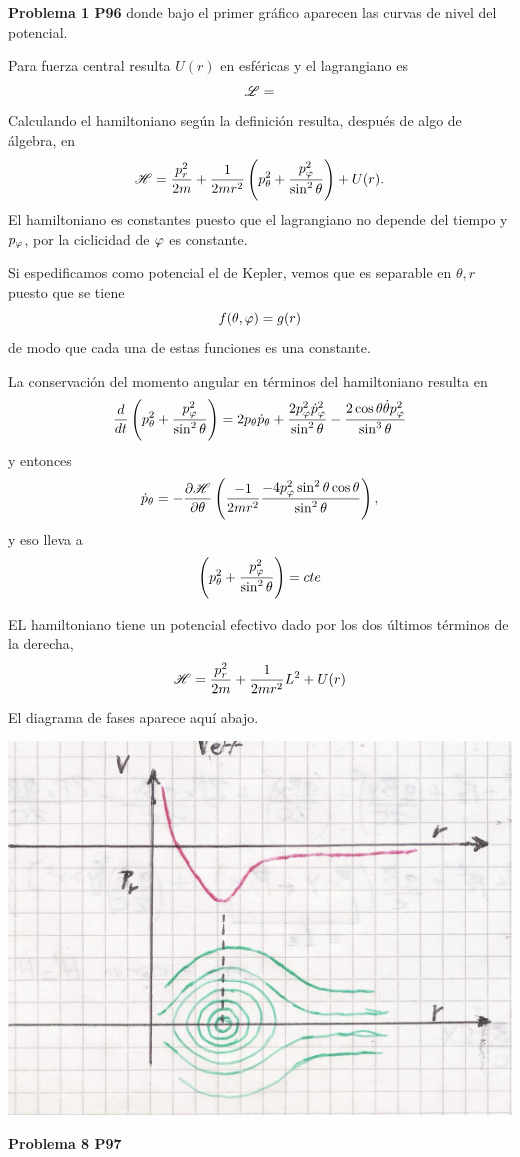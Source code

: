\documentclass[10pt,oneside]{CBFT_book}
\begin{document}
\begin{ejemplo}{\bf Problema 1 P96}
donde bajo el primer gráfico aparecen las curvas de nivel del potencial.

Para fuerza central resulta $U(r)$ en esféricas y el lagrangiano es
\[
	\mathscr{L} =
\]
Calculando el hamiltoniano según la definición resulta, después de algo de álgebra, en
\[
	\mathscr{H} = \frac{p_r^2}{2m} + \frac{1}{2mr^2} \left( p_\theta^2 + \frac{p_\varphi^2}{\sin^2\theta}\right) + U(r) .
\]
El hamiltoniano es constantes puesto que el lagrangiano no depende del tiempo y $p_\varphi$, por la ciclicidad de $\varphi$
es constante.

Si espedificamos como potencial el de Kepler, vemos que es separable en $\theta, r$ puesto que se tiene 
\[
	f(\theta,\varphi) = g(r)
\]
de modo que cada una de estas funciones es una constante.

La conservación del momento angular en términos del hamiltoniano resulta en
\[
	\frac{d^{\hspace{-0.05em}} {}}{d {t}^{\hspace{-0.05em}}} \left( p_\theta^2 + \frac{p_\varphi^2}{\sin^2\theta}\right) = 2 p_\theta \dot{p}_\theta +
	\frac{ 2 p_\varphi^2 \dot{p}_\varphi^2}{\sin^2\theta} - \frac{2\cos\theta\dot{\theta}p_\varphi^2}{\sin^3\theta}
\]
y entonces
\[
	\dot{p}_\theta = -\frac{\partial^{\hspace{-0.05em}} {\mathscr{H}}}{\partial {\theta}^{\hspace{-0.05em}}} \left( \frac{-1}{2mr^2} \frac{-4p_\varphi^2 \sin^2\theta \cos\theta}{\sin^2\theta} \right),
\]
y eso lleva a 
\[
	 \left( p_\theta^2 + \frac{p_\varphi^2}{\sin^2\theta}\right) = cte
\]

EL hamiltoniano tiene un potencial efectivo dado por los dos últimos términos de la derecha,
\[
	\mathscr{H} = \frac{p_r^2}{2m} + \frac{1}{2mr^2} L^2 + U(r)
\]

El diagrama de fases aparece aquí abajo.

\includegraphics[scale=0.35]{images/fig_mc_problema_1_p96_2.jpg} 
 
\end{ejemplo}


\begin{ejemplo}{\bf Problema 8 P97}
 
\end{ejemplo}









\end{document}
